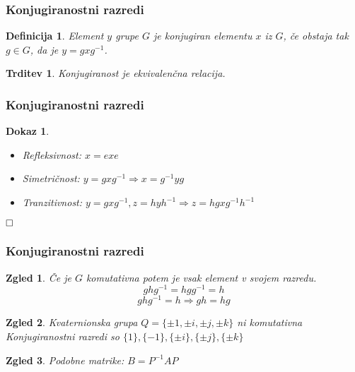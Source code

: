 \documentclass{beamer}
\def\qed{$\hfill\Box$}   %
\newtheorem{trditev}{Trditev}
\newtheorem{definicija}{Definicija}
\newtheorem{zgled}{Zgled}
\newtheorem{dokaz}{Dokaz}
\begin{document}

\begin{frame}
\frametitle{Konjugiranostni razredi}

\begin{definicija}
    Element $y$ grupe $G$ je \emph{konjugiran} elementu $x$ iz $G$, če obstaja tak $g \in G$, da je $y = gxg^{-1}$.
\end{definicija}
\bigskip
\pause

\begin{trditev}
    Konjugiranost je ekvivalenčna relacija.
\end{trditev}

\end{frame}


\begin{frame}
\frametitle{Konjugiranostni razredi}

\begin{dokaz}
    \begin{itemize}
        \item<1->Refleksivnost: $x = exe$
        \bigskip
        \item<2->Simetričnost:  $y = gxg^{-1} \Rightarrow x = g^{-1}yg$
        \bigskip
        \item<3->Tranzitivnost: $y = gxg^{-1}, z = hyh^{-1} \Rightarrow z = hgxg^{-1}h^{-1}$
    \end{itemize}
     \qed
\end{dokaz}

\end{frame}

\begin{frame}
\frametitle{Konjugiranostni razredi}

\begin{zgled}
    Če je $G$ komutativna potem je vsak element v svojem razredu.
    \medskip
    \pause
    \[ghg^{-1} = hgg^{-1} = h\]
    \pause
    \[ghg^{-1} = h \Rightarrow gh = hg\]
    \pause
\end{zgled}

\begin{zgled}
    Kvaternionska grupa $Q = \{\pm 1, \pm i, \pm j, \pm k\}$ ni komutativna
    \newline
    \pause
    Konjugiranostni razredi so $\{1\}, \{-1\}, \{\pm i\}, \{\pm j\}, \{\pm k\}$
    \pause
\end{zgled}

\begin{zgled}
    Podobne matrike: $B = P^{-1}AP$
\end{zgled}

\end{frame}
\end{document}
